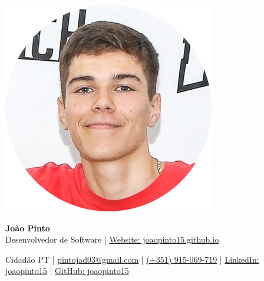 \documentclass[10pt, letterpaper]{article}
\newenvironment{header}{
    \setlength{\topsep}{0pt}\par\kern\topsep\centering\linespread{1}
}{
    \par\kern\topsep
}
\begin{document}
\begin{header}
    \begin{minipage}[c]{0.2\textwidth} %
        \includegraphics[width=\textwidth]{photo.jpg} %
    \end{minipage}
    \hfill
\begin{minipage}[c]{0.75\textwidth} %
    {\fontsize{25 pt}{25 pt}\selectfont \textbf{João Pinto}} \\[0.1cm] %
    {\fontsize{12 pt}{12 pt}\selectfont Desenvolvedor de Software | \href{https://joaopinto15.github.io}{Website: joaopinto15.github.io}}
\end{minipage}

    
    \vspace{0.8cm} %
    \centering
    \normalsize
    Cidadão PT | 
    \href{mailto:pintojad03@gmail.com}{pintojad03@gmail.com} | 
    \href{tel:+351-915-069-719}{(+351) 915-069-719} | 
    \href{https://linkedin.com/in/joaopinto15}{LinkedIn: joaopinto15} | 
    \href{https://github.com/joaopinto15}{GitHub: joaopinto15}
\end{header}
\end{document}
